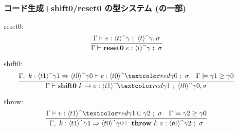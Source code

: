 

\begin{frame}[fragile]
  \frametitle{コード生成+shift0/reset0 の型システム\small{ (の一部)}}
  reset0:
  \[
    \infer{\Gamma \vdash \resetz{e} : \codeTs{t}{\gamma} ~;~ \sigma}
    {\Gamma \vdash e : \codeTs{t}{\gamma} ~;~ \codeTs{t}{\gamma}, \sigma}
  \]

  shift0:
  \[
    \infer{\Gamma \vdash \shiftz{k}{e} : \codeTs{t1}{\red{\gamma1}} ~;~ \codeTs{t0}{\gamma0},\sigma}
    {\Gamma,~k:\contT{\codeTs{t1}{\gamma1}}{\codeTs{t0}{\gamma0}}
      \vdash e : \codeTs{t0}{\red{\gamma0}} ~;~ \sigma
      & \Gamma \models \gamma1 \ord \gamma0
    }
  \]

  throw:
  \[
    \infer
    {\Gamma,~k:\contT{\codeTs{t1}{\gamma1}}{\codeTs{t0}{\gamma0}}
      \vdash \throw{k}{v} : \codeTs{t0}{\gamma2} ~;~ \sigma}
    {\Gamma
      \vdash v : \codeTs{t1}{\red{\gamma1 \cup \gamma2}} ~;~ \sigma
      & \Gamma \models \gamma2 \ord \gamma0
    }
  \]
\end{frame}


